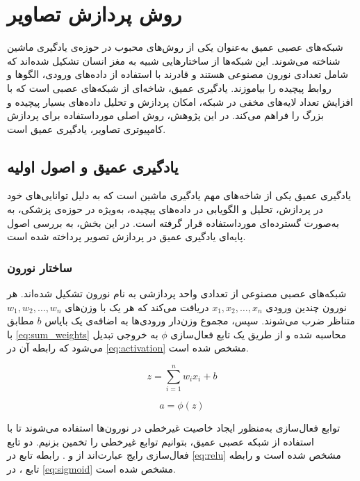 \section{روش پردازش تصاویر}
شبکه‌های عصبی عمیق به‌عنوان یکی از روش‌های محبوب در حوزه‌ی یادگیری ماشین شناخته می‌شوند. این شبکه‌ها از ساختارهایی شبیه به مغز انسان تشکیل شده‌اند که شامل تعدادی نورون  مصنوعی هستند و قادرند با استفاده از داده‌های ورودی، الگوها و روابط پیچیده را بیاموزند. یادگیری عمیق، شاخه‌ای از شبکه‌های عصبی است که با افزایش تعداد لایه‌های مخفی در شبکه، امکان پردازش و تحلیل داده‌های بسیار پیچیده و بزرگ را فراهم می‌کند.
در این پژوهش، روش اصلی مورداستفاده برای پردازش کامپیوتری تصاویر، یادگیری عمیق است.
\subsection{یادگیری عمیق و اصول اولیه}
یادگیری عمیق یکی از شاخه‌های مهم یادگیری ماشین است که به دلیل توانایی‌های خود در پردازش، تحلیل و الگویابی در داده‌های پیچیده، به‌ویژه در حوزه‌ی پزشکی، به به‌صورت گسترده‌ای مورداستفاده قرار گرفته است. در این بخش، به بررسی اصول پایه‌ای یادگیری عمیق در پردازش تصویر پرداخته شده است.

\subsubsection{ساختار نورون}
شبکه‌های عصبی مصنوعی از تعدادی واحد پردازشی به نام نورون تشکیل شده‌اند. هر نورون چندین ورودی \(x_1, x_2, \ldots, x_n\) دریافت می‌کند که هر یک با وزن‌های \(w_1, w_2, \ldots, w_n\) متناظر ضرب می‌شوند. سپس، مجموع وزن‌دار ورودی‌ها به اضافه‌ی یک بایاس \(b\) مطابق با \autoref{eq:sum_weights} محاسبه شده و از طریق یک تابع فعال‌سازی \(\phi\) به خروجی تبدیل می‌شود که رابطه آن در \autoref{eq:activation} مشخص شده است.

\begin{latin}
\begin{equation}
\label{eq:sum_weights}
z = \sum_{i=1}^{n} w_i x_i + b
\end{equation}
\end{latin}

\begin{latin}
\begin{equation}
\label{eq:activation}
a = \phi(z)
\end{equation}
\end{latin}

توابع فعال‌سازی به‌منظور ایجاد خاصیت غیرخطی در نورون‌ها استفاده ‌می‌شوند تا با استفاده از شبکه عصبی عمیق،‌ بتوانیم توابع غیرخطی را تخمین بزنیم. دو تابع فعال‌سازی رایج عبارت‌اند از
  و
 .
  رابطه تابع
    در
     \autoref{eq:relu}
      مشخص شده است و رابطه تابع 
      ، 
      در
      \autoref{eq:sigmoid}
      مشخص شده است.

